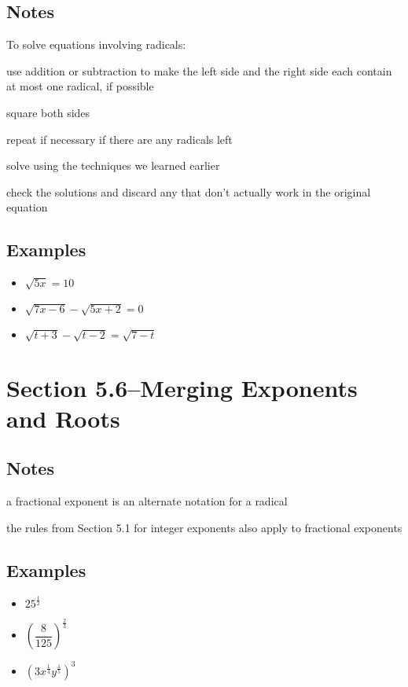 \documentclass[fleqn,addpoints]{exam}
\begin{document}
\subsection{Notes}

To solve equations involving radicals:
\begin{itemize*}
  \item use addition or subtraction to make the left side and the right side each contain at most one radical, if possible
  \item square both sides
  \item repeat if necessary if there are any radicals left
  \item solve using the techniques we learned earlier  
  \item check the solutions and discard any that don't actually work in the original equation
\end{itemize*}

\subsection{Examples}
\begin{itemize}
  \item \( \sqrt{5x} = 10\)
  \item \( \sqrt{7x-6} - \sqrt{5x+2} = 0 \)
  \item \( \sqrt{t+3} - \sqrt{t-2} = \sqrt{7-t} \)
\end{itemize}

\section{Section 5.6--Merging Exponents and Roots}

\subsection{Notes}

\begin{itemize*}
  \item a fractional exponent is an alternate notation for a radical
  \item the rules from Section 5.1 for integer exponents also apply to fractional exponents
\end{itemize*}

\subsection{Examples}
\begin{itemize}
 \item \( 25^{\frac{1}{2}}\)
  \item \( \left( \dfrac{8}{125} \right)^{\frac{2}{3}} \)
  \item \( (3x^{\frac{1}{4}}y^{\frac{1}{5}})^3 \)
\end{itemize}
\end{document}

